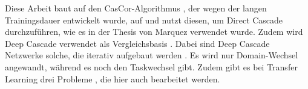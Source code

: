 Diese Arbeit baut auf den CasCor-Algorithmus \cite{cascor}, der wegen der langen Trainingsdauer entwickelt wurde, auf und nutzt diesen, 
um Direct Cascade \cite{cascade_network_architectures} 
durchzuführen, wie es in der Thesis von Marquez \cite{phd_deep_cascade} verwendet wurde. Zudem wird Deep Cascade verwendet als 
Vergleichsbasis \cite{deep_cascade_learning}. Dabei sind Deep Cascade Netzwerke solche, die iterativ aufgebaut werden \cite{Constructive_Cascade}. 
Es wird nur Domain-Wechsel angewandt, während es noch den Taskwechsel \cite{transfer_learning} gibt. Zudem gibt es bei Transfer Learning drei 
Probleme \cite{survey_transfer}, die hier auch bearbeitet werden. 





